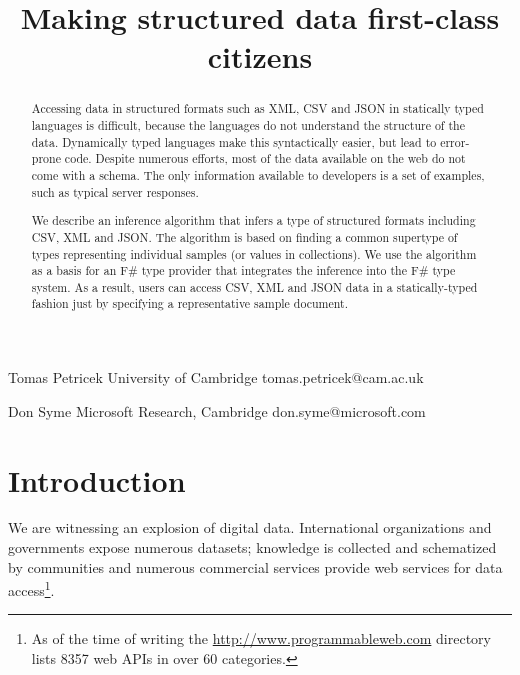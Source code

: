 \documentclass[10pt]{sigplanconf}
\begin{document}
\title{Making structured data first-class citizens}

\authorinfo
  {Tomas Petricek}
  {University of Cambridge}
  {tomas.petricek@cam.ac.uk}

\authorinfo
  {Don Syme}
  {Microsoft Research, Cambridge}
  {don.syme@microsoft.com}

\maketitle


\begin{abstract}

Accessing data in structured formats such as XML, CSV and JSON in statically typed languages 
is difficult, because the languages do not understand the structure of the data. Dynamically
typed languages make this syntactically easier, but lead to error-prone code.
Despite numerous efforts, most of the data available on the web do not come with a schema. 
The only information available to developers is a set of examples, such as typical server
responses.

We describe an inference algorithm that infers a type of structured formats including 
CSV, XML and JSON. The algorithm is based on finding a common supertype of types
representing individual samples (or values in collections).
We use the algorithm as a basis for an F\# type provider that integrates the inference
into the F\# type system. As a result, users can access CSV, XML and JSON data in a 
statically-typed fashion just by specifying a representative sample document.
\end{abstract}


\section{Introduction}
\label{sec:intro}

We are witnessing an explosion of digital data. International organizations \cite{data-worldbank}
and governments \cite{data-opengovuk,data-opengovusa} expose numerous datasets; 
knowledge is collected and schematized by communities \cite{data-freebase} and numerous 
commercial services provide web services for data access\footnote{As of the time of writing the 
\url{http://www.programmableweb.com} directory lists 8357 web APIs in over 60 categories.}.
\end{document}
